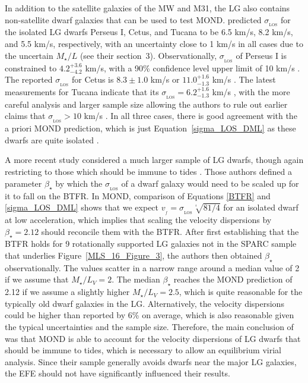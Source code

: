 \documentclass[fleqn,usenatbib,useAMS]{mnras} %
\begin{document}
In addition to the satellite galaxies of the MW and M31, the LG also contains non-satellite dwarf galaxies that can be used to test MOND. \citet{Pawlowski_McGaugh_2014} predicted $\sigma_{_\text{LOS}}$ for the isolated LG dwarfs Perseus I, Cetus, and Tucana to be 6.5 km/s, 8.2 km/s, and 5.5 km/s, respectively, with an uncertainty close to 1 km/s in all cases due to the uncertain $M_{\star}/L$ (see their section~3). Observationally, $\sigma_{_\text{LOS}}$ of Perseus I is constrained to $4.2^{+3.6}_{-4.2}$ km/s, with a 90\% confidence level upper limit of 10 km/s \citep{Martin_2014}. The reported $\sigma_{_\text{LOS}}$ for Cetus is $8.3 \pm 1.0$ km/s \citep{Kirby_2014} or $11.0^{+1.6}_{-1.3}$ km/s \citep{Taibi_2018}. The latest measurements for Tucana indicate that its $\sigma_{_\text{LOS}} = 6.2^{+1.6}_{-1.3}$ km/s \citep{Taibi_2020}, with the more careful analysis and larger sample size allowing the authors to rule out earlier claims that $\sigma_{_\text{LOS}} > 10$ km/s \citep{Fraternali_2009, Guo_2019}. In all three cases, there is good agreement with the a priori MOND prediction, which is just Equation~\ref{sigma_LOS_DML} as these dwarfs are quite isolated \citep{Pawlowski_McGaugh_2014}.

A more recent study considered a much larger sample of LG dwarfs, though again restricting to those which should be immune to tides \citep{McGaugh_2021}. Those authors defined a parameter $\beta_{\star}$ by which the $\sigma_{_\text{LOS}}$ of a dwarf galaxy would need to be scaled up for it to fall on the BTFR. In MOND, comparison of Equations \ref{BTFR} and \ref{sigma_LOS_DML} shows that we expect $v_{_f} = \sigma_{_\text{LOS}} \sqrt[^4]{81/4}$ for an isolated dwarf at low acceleration, which implies that scaling the velocity dispersions by $\beta_{\star} = 2.12$ should reconcile them with the BTFR. After first establishing that the BTFR holds for 9 rotationally supported LG galaxies not in the SPARC sample that underlies Figure~\ref{MLS_16_Figure_3}, the authors then obtained $\beta_{\star}$ observationally. The values scatter in a narrow range around a median value of 2 if we assume that $M_{\star}/L_V = 2$. The median $\beta_{\star}$ reaches the MOND prediction of 2.12 if we assume a slightly higher $M_{\star}/L_V = 2.5$, which is quite reasonable for the typically old dwarf galaxies in the LG. Alternatively, the velocity dispersions could be higher than reported by 6\% on average, which is also reasonable given the typical uncertainties and the sample size. Therefore, the main conclusion of \citet{McGaugh_2021} was that MOND is able to account for the velocity dispersions of LG dwarfs that should be immune to tides, which is necessary to allow an equilibrium virial analysis. Since their sample generally avoids dwarfs near the major LG galaxies, the EFE should not have significantly influenced their results.
\end{document}
